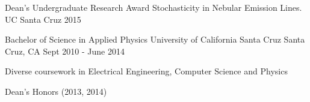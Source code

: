   
        \begin{cvhonors}
          \cvhonor
            {Dean's Undergraduate Research Award}
            {Stochasticity in Nebular Emission Lines.}
            {UC Santa Cruz}
            {2015}
        \end{cvhonors}

        \begin{cventries}
          \cventry
            {Bachelor of Science in Applied Physics}
            {University of California Santa Cruz}
            {Santa Cruz, CA}
            {Sept 2010 - June 2014}
            {
              \begin{cvitems}
                \item {Diverse coursework in Electrical Engineering, Computer Science and Physics}
                \item{Dean's Honors (2013, 2014)}
              \end{cvitems}
            }
        \end{cventries}
